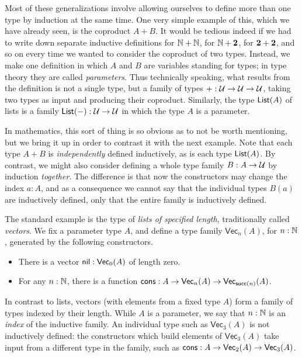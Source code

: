 Most of these generalizations involve allowing ourselves to define more than one type by induction at the same time.
One very simple example of this, which we have already seen, is the coproduct $A+B$.
It would be tedious indeed if we had to write down separate inductive definitions for $\mathbb{N}+\mathbb{N}$, for $\mathbb{N}+\mathbf{2}$, for $\mathbf{2}+\mathbf{2}$, and so on every time we wanted to consider the coproduct of two types.
Instead, we make one definition in which $A$ and $B$ are variables standing for types; in type theory they are called \emph{parameters}.
Thus technically speaking, what results from the definition is not a single type, but a family of types $+ : \mathcal{U}\to\mathcal{U}\to\mathcal{U}$, taking two types as input and producing their coproduct.
Similarly, the type $\mathsf{List}(A)$ of lists is a family $\mathsf{List}(-):\mathcal{U}\to\mathcal{U}$ in which the type $A$ is a parameter.

In mathematics, this sort of thing is so obvious as to not be worth mentioning, but we bring it up in order to contrast it with the next example.
Note that each type $A+B$ is \emph{independently} defined inductively, as is each type $\mathsf{List}(A)$.
By contrast, we might also consider defining a whole type family $B:A\to\mathcal{U}$ by induction \emph{together}.
The difference is that now the constructors may change the index $a:A$, and as a consequence we cannot say that the individual types $B(a)$ are inductively defined, only that the entire family is inductively defined.

\newcommand{\vect}[2]{\ensuremath{\mathsf{Vec}_{#1}(#2)}\xspace}

The standard example is the type of \emph{lists of specified length}, traditionally called \emph{vectors}.
We fix a parameter type $A$, and define a type family $\vect n A$, for $n:\mathbb{N}$, generated by the following constructors.
\begin{itemize}
\item There is a vector $\nil:\vect 0 A$ of length zero.
\item For any $n:\mathbb{N}$, there is a function $\cons:A\to \vect n A \to \vect{\suc (n)} A$.
\end{itemize}
In contrast to lists, vectors (with elements from a fixed type $A$) form a family of types indexed by their length.
While $A$ is a parameter, we say that $n:\mathbb{N}$ is an \emph{index} of the inductive family.
An individual type such as $\vect3A$ is not inductively defined: the constructors which build elements of $\vect3A$ take input from a different type in the family, such as $\cons:A \to \vect2A \to \vect3A$.

